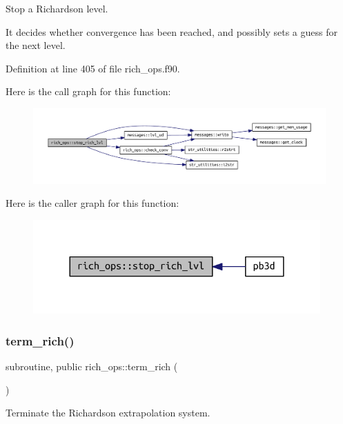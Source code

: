 Stop a Richardson level. 

It decides whether convergence has been reached, and possibly sets a guess for the next level. 

Definition at line 405 of file rich\+\_\+ops.\+f90.

Here is the call graph for this function\+:\nopagebreak
\begin{figure}[H]
\begin{center}
\leavevmode
\includegraphics[width=350pt]{namespacerich__ops_a0cce16b835e18b025d366a038b22efe1_cgraph}
\end{center}
\end{figure}
Here is the caller graph for this function\+:\nopagebreak
\begin{figure}[H]
\begin{center}
\leavevmode
\includegraphics[width=312pt]{namespacerich__ops_a0cce16b835e18b025d366a038b22efe1_icgraph}
\end{center}
\end{figure}
\mbox{\label{namespacerich__ops_a3cf72a3ed0806ac9ddff262a00b2e33d}} 
\subsubsection{\texorpdfstring{term\+\_\+rich()}{term\_rich()}}
{\footnotesize\ttfamily subroutine, public rich\+\_\+ops\+::term\+\_\+rich (\begin{DoxyParamCaption}{ }\end{DoxyParamCaption})}



Terminate the Richardson extrapolation system. 

